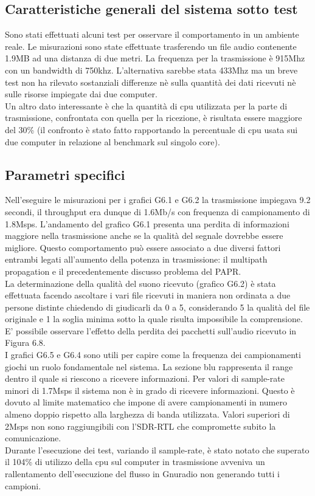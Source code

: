 \subsection{Caratteristiche generali del sistema sotto test}
 Sono stati effettuati alcuni test per osservare il comportamento in un ambiente reale. Le misurazioni sono state effettuate trasferendo un file audio contenente 1.9MB ad una distanza di due metri. La frequenza per la trasmissione è 915Mhz con un bandwidth di 750khz. L'alternativa sarebbe stata 433Mhz ma un breve test non ha rilevato sostanziali differenze nè sulla quantità dei dati ricevuti nè sulle risorse impiegate dai due computer.
 \\Un altro dato interessante è che la quantità di cpu utilizzata per la parte di trasmissione, confrontata con quella per la ricezione, è risultata essere maggiore del 30\% (il confronto è stato fatto rapportando la percentuale di cpu usata sui due computer in relazione al benchmark sul singolo core).
 \subsection{Parametri specifici}
 Nell'eseguire le misurazioni per i grafici G6.1 e G6.2 la trasmissione impiegava 9.2 secondi, il throughput era dunque di 1.6Mb/s con frequenza di campionamento di 1.8Msps. L'andamento del grafico G6.1 presenta una perdita di informazioni maggiore nella trasmissione anche se la qualità del segnale dovrebbe essere migliore. Questo comportamento può essere associato a due diversi fattori entrambi legati all'aumento della potenza in trasmissione: il multipath propagation e il precedentemente discusso problema del PAPR.
 \\ La determinazione della qualità del suono ricevuto (grafico G6.2) è stata effettuata facendo ascoltare i vari file ricevuti in maniera non ordinata a due persone distinte chiedendo di giudicarli da 0 a 5, considerando 5 la qualità del file originale e 1 la soglia minima sotto la quale risulta impossibile la comprensione.
 E' possibile osservare l'effetto della perdita dei pacchetti sull'audio ricevuto in Figura 6.8.
 \\I grafici G6.5 e G6.4 sono utili per capire come la frequenza dei campionamenti giochi un ruolo fondamentale nel sistema.
 La sezione blu rappresenta il range dentro il quale si riescono a ricevere informazioni. Per valori di sample-rate minori di 1.7Msps il sistema non è in grado di ricevere informazioni. Questo è dovuto al limite matematico che impone di avere campionamenti in numero almeno doppio rispetto alla larghezza di banda utilizzata.
 Valori superiori di 2Msps non sono raggiungibili con l'SDR-RTL che compromette subito la comunicazione.
 \\Durante l'esecuzione dei test, variando il sample-rate, è stato notato che superato il 104\% di utilizzo della cpu sul computer in trasmissione avveniva un rallentamento dell'esecuzione del flusso in Gnuradio non generando tutti i campioni.
 
